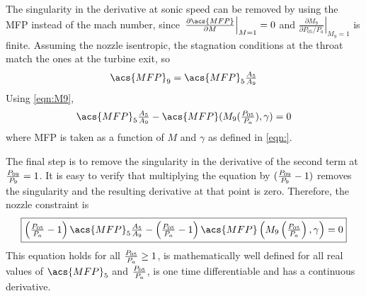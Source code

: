 \documentclass[tcc]{subfiles}
\begin{document}
The singularity in the derivative at sonic speed can be removed by using the \ac{MFP} instead of the mach number, since 
$\left.\frac{\partial\acs{MFP}}{\partial M} \right|_{M=1} = 0$ 
and 
$\left.\frac{\partial M_9}{\partial P_{05}/P_a}\right|_{M_9=1}$ is finite.
 Assuming the nozzle isentropic, the stagnation conditions at the throat match the ones at the turbine exit, so
\begin{equation}
    \acs{MFP}_9 = \acs{MFP}_5 \tfrac{A_5}{A_9}
\end{equation}
Using \cref{eqn:M9},
\begin{equation}
    \textstyle
    \acs{MFP}_5 \tfrac{A_5}{A_9} - \acs{MFP}(M_9(\pr{05}{a}), \gamma) = 0
\end{equation}
where \acs{MFP} is taken as a function of $M$ and $\gamma$ as defined in \cref{eqn:}.

The final step is to remove the singularity in the derivative of the second term at $\frac{P_{09}}{P_{9}} = 1$. 
It is easy to verify that multiplying the equation by $(\frac{P_{09}}{P_{9}}-1)$ removes the singularity and the resulting derivative at that point is zero. 
Therefore, the nozzle constraint is
\begin{equation}
    \boxed{
    \textstyle
        \left(\pr{05}{a}-1\right)\acs{MFP}_5\frac{A_5}{A_9} - \left(\pr{05}{a}-1\right)\acs{MFP}\left(M_9\left(\pr{05}{a}\right), \gamma\right) = 0
    }
\end{equation}
This equation holds for all $\frac{P_{05}}{P_{a}} \geq 1$, is mathematically well defined for all real values of $\acs{MFP}_5$ and $\frac{P_{05}}{P_{a}}$, is one time differentiable and has a continuous derivative.
\end{document}

